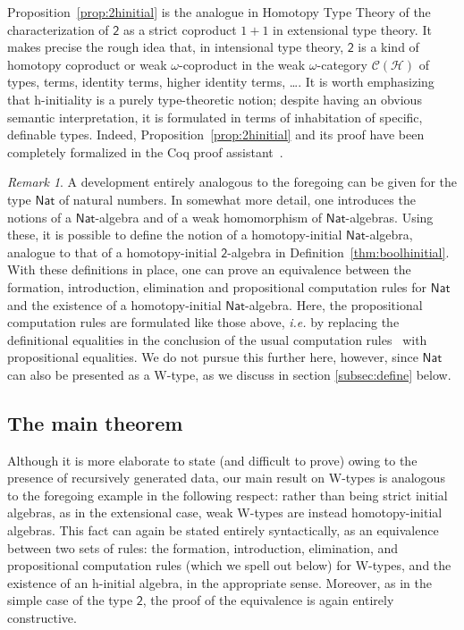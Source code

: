 \documentclass{article}
\newcommand{\nat}{\ensuremath{\mathsf{Nat}}}
\newcommand{\Bool}{\mathsf{2}}
\newcommand{\Hint}{\mathcal{H}}
\theoremstyle{remark}
\newtheorem{remark}[theorem]{Remark}
\theoremstyle{definition}
\begin{document}
Proposition~\ref{prop:2hinitial} is the analogue in Homotopy Type Theory of the characterization of 
$\Bool$ as a strict coproduct $1+1$ in extensional type theory. It makes precise the rough idea that, 
in intensional type theory, $\Bool$ is a kind of homotopy coproduct or weak $\omega$-coproduct 
in the weak $\omega$-category $\mathcal{C}(\Hint)$ of types, terms, identity terms, higher identity terms, \ldots.  
It is worth emphasizing that h-initiality is a purely type-theoretic notion; despite having an obvious semantic interpretation, it is formulated in terms of inhabitation of specific, definable types.  Indeed, Proposition~\ref{prop:2hinitial} and its proof have been completely formalized in the Coq proof assistant~\cite{AwodeyS:indtht}.  

\begin{remark} A development entirely analogous to the foregoing can be given for the type
$\nat$ of natural numbers. In somewhat more detail, one introduces the notions of a $\nat$-algebra and 
of a weak homomorphism of $\nat$-algebras. Using these, it is possible to define the notion of
a homotopy-initial $\nat$-algebra, analogue to that of a homotopy-initial
$\Bool$-algebra in Definition~\ref{thm:boolhinitial}. With these definitions in place, one can prove an equivalence between the formation, introduction, elimination and propositional computation rules for $\nat$ and the existence of a homotopy-initial $\nat$-algebra. 
Here, the propositional computation rules are formulated like those above, \emph{i.e.} by replacing the definitional equalities in the conclusion of the usual computation rules~\cite[Section~5.3]{NordstromB:marltt} with propositional equalities. 
 We do not pursue this further here, however, since $\nat$ can also be presented as a W-type, as we discuss in section \ref{subsec:define} below.
\end{remark}

\subsection{The main theorem}\label{subsection:main}

\noindent Although it is more elaborate to state (and difficult to prove) owing to the presence of 
recursively generated data, our main result on  W-types is analogous to 
the foregoing example in the following respect: rather than being strict initial algebras, as in the 
extensional case, weak W-types are instead homotopy-initial algebras.  This fact can again be stated 
entirely syntactically, as an equivalence between two sets of rules:  the 
formation, introduction, elimination, and propositional computation rules (which we spell
out below) for W-types, and the existence of an h-initial algebra, in the appropriate sense.  Moreover, as in the simple case of the type $\Bool$, the proof of the equivalence is again entirely constructive. 
\end{document}
